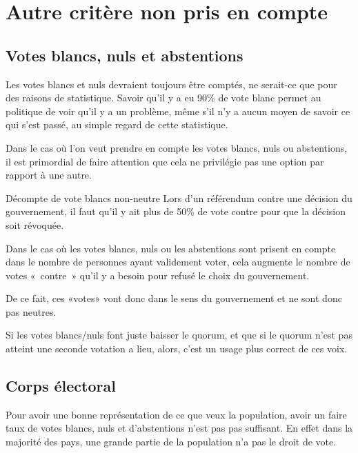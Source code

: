 \documentclass[../report]{subfiles}
\begin{document}
  \section{Autre critère non pris en compte}
  \subsection{Votes blancs, nuls et abstentions}

  Les votes blancs et nuls devraient toujours être comptés, ne serait-ce que pour des raisons de
  statistique.
  Savoir qu'il y a eu 90\% de vote blanc permet au politique de voir qu'il y a un problème, même
  s'il n'y a aucun moyen de savoir ce qui s'est passé, au simple regard de cette statistique.

  Dans le cas où l'on veut prendre en compte les votes blancs, nuls ou abstentions, il est primordial
  de faire attention que cela ne privilégie pas une option par rapport à une autre.

  \begin{nota}{Décompte de vote blancs non-neutre}
    Lors d'un référendum contre une décision du gouvernement, il faut qu'il y ait plus de 50\% 
    de vote contre pour que la décision soit révoquée.

    Dans le cas où les votes blancs, nuls ou les abstentions sont prisent en compte dans 
    le nombre de personnes ayant validement voter, cela augmente le nombre de votes «~contre~» 
    qu'il y a besoin pour refusé le choix du gouvernement.

    De ce fait, ces «votes» vont donc dans le sens du gouvernement et ne sont donc pas neutres. 

    Si les votes blancs/nuls font juste baisser le quorum, et que si le quorum n'est pas atteint
    une seconde votation a lieu, alors, c'est un usage plus correct de ces voix.

  \end{nota}


  \subsection{Corps électoral}

  Pour avoir une bonne représentation de ce que veux la population, avoir un faire taux de votes
  blancs, nuls et d'abstentions n'est pas pas suffisant.
  En effet dans la majorité des pays, une grande partie de la population n'a pas le droit de vote.
\end{document}
